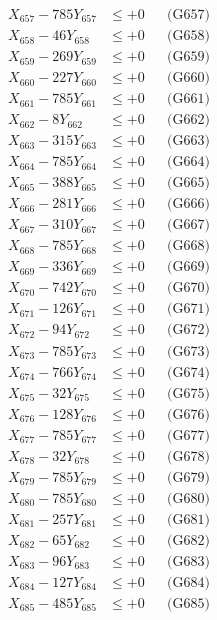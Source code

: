 \documentclass[a4paper,10pt]{article}
\begin{document}
{\begin{align}
X_{657} - 785Y_{657} &\leq +0 && \text{(G657)} \\
X_{658} - 46Y_{658} &\leq +0 && \text{(G658)} \\
X_{659} - 269Y_{659} &\leq +0 && \text{(G659)} \\
X_{660} - 227Y_{660} &\leq +0 && \text{(G660)} \\
\allowbreak
X_{661} - 785Y_{661} &\leq +0 && \text{(G661)} \\
X_{662} - 8Y_{662} &\leq +0 && \text{(G662)} \\
X_{663} - 315Y_{663} &\leq +0 && \text{(G663)} \\
X_{664} - 785Y_{664} &\leq +0 && \text{(G664)} \\
X_{665} - 388Y_{665} &\leq +0 && \text{(G665)} \\
X_{666} - 281Y_{666} &\leq +0 && \text{(G666)} \\
X_{667} - 310Y_{667} &\leq +0 && \text{(G667)} \\
X_{668} - 785Y_{668} &\leq +0 && \text{(G668)} \\
X_{669} - 336Y_{669} &\leq +0 && \text{(G669)} \\
X_{670} - 742Y_{670} &\leq +0 && \text{(G670)} \\
\allowbreak
X_{671} - 126Y_{671} &\leq +0 && \text{(G671)} \\
X_{672} - 94Y_{672} &\leq +0 && \text{(G672)} \\
X_{673} - 785Y_{673} &\leq +0 && \text{(G673)} \\
X_{674} - 766Y_{674} &\leq +0 && \text{(G674)} \\
X_{675} - 32Y_{675} &\leq +0 && \text{(G675)} \\
X_{676} - 128Y_{676} &\leq +0 && \text{(G676)} \\
X_{677} - 785Y_{677} &\leq +0 && \text{(G677)} \\
X_{678} - 32Y_{678} &\leq +0 && \text{(G678)} \\
X_{679} - 785Y_{679} &\leq +0 && \text{(G679)} \\
X_{680} - 785Y_{680} &\leq +0 && \text{(G680)} \\
\allowbreak
X_{681} - 257Y_{681} &\leq +0 && \text{(G681)} \\
X_{682} - 65Y_{682} &\leq +0 && \text{(G682)} \\
X_{683} - 96Y_{683} &\leq +0 && \text{(G683)} \\
X_{684} - 127Y_{684} &\leq +0 && \text{(G684)} \\
X_{685} - 485Y_{685} &\leq +0 && \text{(G685)} \\

\end{align}}
\end{document}
